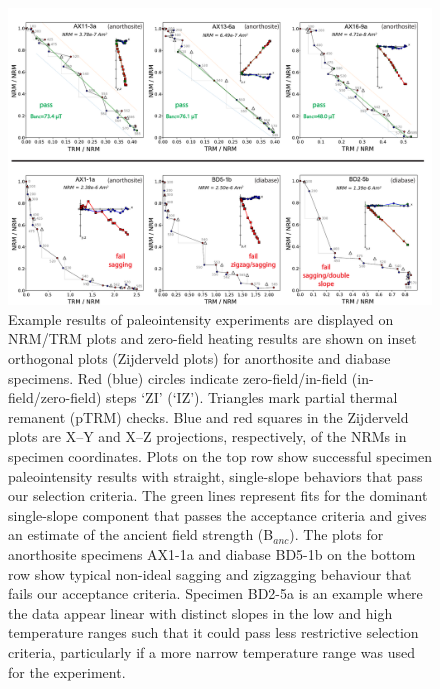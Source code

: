 \documentclass[9pt,twocolumn,twoside,lineno]{pnas-new}
\begin{document}
\begin{figure}
\noindent\includegraphics[width=17.8cm]{IZZI_examples.pdf}
\centering
\caption{\footnotesize{Example results of paleointensity experiments are displayed on NRM/TRM plots and zero-field heating results are shown on inset orthogonal plots (Zijderveld plots) for anorthosite and diabase specimens. Red (blue) circles indicate zero-field/in-field (in-field/zero-field) steps `ZI’ (`IZ’). Triangles mark partial thermal remanent (pTRM) checks. Blue and red squares in the Zijderveld plots are X–Y and X–Z projections, respectively, of the NRMs in specimen coordinates. Plots on the top row show successful specimen paleointensity results with straight, single-slope behaviors that pass our selection criteria. The green lines represent fits for the dominant single-slope component that passes the acceptance criteria and gives an estimate of the ancient field strength (B$_{anc}$). The plots for anorthosite specimens AX1-1a and diabase BD5-1b on the bottom row show typical non-ideal sagging and zigzagging behaviour that fails our acceptance criteria. Specimen BD2-5a is an example where the data appear linear with distinct slopes in the low and high temperature ranges such that it could pass less restrictive selection criteria, particularly if a more narrow temperature range was used for the experiment.}}
\label{fig:IZZI_examples}
\end{figure}
\end{document}
